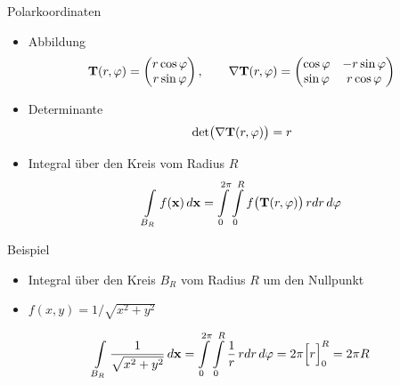 \begin{frame}{Polarkoordinaten}
  \begin{itemize}
  \item Abbildung
    \begin{gather*}
      \mathbf{T}(r,\varphi) =
      \begin{pmatrix}
        r \cos\varphi\\
        r \sin\varphi
      \end{pmatrix},
      \qquad
      \nabla \mathbf{T}(r,\varphi) =
      \begin{pmatrix}
        \cos \varphi & -r \sin \varphi \\
        \sin \varphi & r \cos \varphi
      \end{pmatrix}
    \end{gather*}
  \item Determinante
    \begin{gather*}
      \operatorname{det}\bigl(\nabla \mathbf{T}(r,\varphi)\bigr) = r
    \end{gather*}
  \item Integral über den Kreis vom Radius $R$
    \begin{gather*}
      \int\limits_{B_R} f(\mathbf{x})\,d\mathbf{x}
      = \int\limits_0^{2\pi}\int\limits_0^R  f\bigl(\mathbf{T}(r,\varphi)\bigr) \,rdr\,d\varphi
    \end{gather*}
  \end{itemize}
\end{frame}

\begin{frame}{Beispiel}
  \begin{itemize}
  \item Integral über den Kreis $B_R$ vom Radius $R$ um den Nullpunkt
  \item $f(x,y) = 1/\sqrt{x^2+y^2}$
  \end{itemize}
  \begin{gather*}
    \int\limits_{B_R} \frac{1}{\sqrt{x^2+y^2}}\,d\mathbf{x}
    = \int\limits_0^{2\pi}\int\limits_0^R  \frac1r \,rdr\,d\varphi
    = 2\pi \Bigl[r\Bigr]_0^R = 2\pi R
  \end{gather*}
\end{frame}

